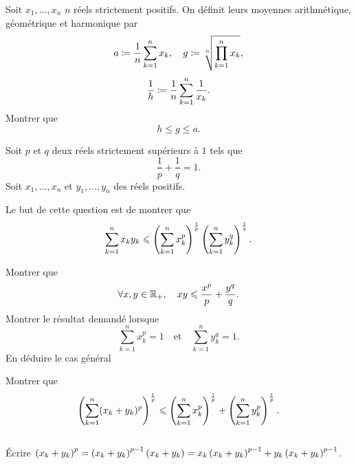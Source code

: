 \documentclass{magnolia}
\begin{document}
Soit $x_1,\ldots,x_n$ $n$ réels strictement positifs. On définit leurs
moyennes arithmétique, géométrique et harmonique par
\[a\coloneqq \frac{1}{n}\sum_{k=1}^n x_k, \quad g\coloneqq\sqrt[n]{\prod_{k=1}^n x_k},\]
\[\frac{1}{h}\coloneqq \frac{1}{n}\sum_{k=1}^n \frac{1}{x_k}.\]
Montrer que
\[h\leq g\leq a.\]

Soit $p$ et $q$ deux réels strictement supérieurs à $1$ tels que
\[\frac{1}{p}+\frac{1}{q}=1.\]
Soit $x_1,\ldots,x_n$ et $y_1,\ldots,y_n$ des réels positifs.
\begin{questions}
\question Le but de cette question est de montrer que
  \[\sum_{k=1}^n x_k y_k \leqslant \left(\sum_{k=1}^n x_k^p\right)^{\frac{1}{p}}
                              \left(\sum_{k=1}^n y_k^q\right)^{\frac{1}{q}}.\]
  \begin{questions}
  \question Montrer que
    \[\forall x,y\in\mathbb{R}_+ ,\quad xy\leqslant\frac{x^p}{p}+\frac{y^q}{q}.\]
  \question Montrer le résultat demandé lorsque
    \[\sum_{k=1}^n x_k^p=1 \quad \text{et} \quad \sum_{k=1}^n y_k^q=1.\]
  \question En déduire le cas général
  \end{questions}
\question Montrer que
  \[\left(\sum_{k=1}^n (x_k+y_k)^p\right)^{\frac{1}{p}} \leqslant
    \left(\sum_{k=1}^n x_k^p\right)^{\frac{1}{p}}+
    \left(\sum_{k=1}^n y_k^p\right)^{\frac{1}{p}}.\]
\end{questions}
\begin{sol}
$\quad$
\begin{questions}
\question Écrire $\left(x_k+y_k\right)^p=\left(x_k+y_k\right)^{p-1}\left(x_k+y_k\right)=x_k\left(x_k+y_k\right)^{p-1}
  +y_k\left(x_k+y_k\right)^{p-1}$.
\end{questions}
\end{sol}

\end{document}
